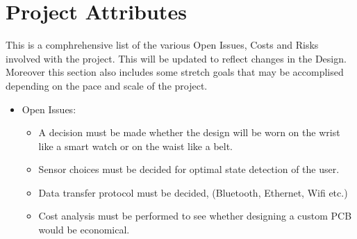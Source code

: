 \documentclass[12pt]{article}
\begin{document}
\newpage
\section{Project Attributes}
\label{Project_Attr}
This is a comphrehensive list of the various Open Issues, Costs and Risks involved with the project. This will be updated to reflect changes in the Design. Moreover this section also includes some stretch goals that may be accomplised depending on the pace and scale of the project.\\
\begin{itemize}
\item Open Issues:
	\begin{itemize}
		\item A decision must be made whether the design will be worn on the wrist like a smart watch or on the waist like a belt.
		\item Sensor choices must be decided for optimal state detection of the user.
		\item Data transfer protocol must be decided, (Bluetooth, Ethernet, Wifi etc.)
		\item Cost analysis must be performed to see whether designing a custom PCB would be economical.
	\end{itemize}
	


\end{itemize}
\end{document}

